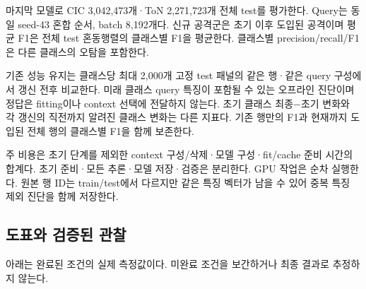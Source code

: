 마지막 모델로 CIC 3,042,473개·ToN 2,271,723개 전체 test를 평가한다. Query는 동일 seed-43 혼합 순서, batch 8,192개다. 신규 공격군은 초기 이후 도입된 공격이며 평균 F1은 전체 test 혼동행렬의 클래스별 F1을 평균한다. 클래스별 precision/\allowbreak{}recall/\allowbreak{}F1은 다른 클래스의 오탐을 포함한다.

기존 성능 유지는 클래스당 최대 2,000개 고정 test 패널의 같은 행·같은 query 구성에서 갱신 전후 비교한다. 미래 클래스 query 특징이 포함될 수 있는 오프라인 진단이며 정답은 fitting이나 context 선택에 전달하지 않는다. 초기 클래스 최종−초기 변화와 각 갱신의 직전까지 알려진 클래스 변화는 다른 지표다. 기존 행만의 F1과 현재까지 도입된 전체 행의 클래스별 F1을 함께 보존한다.

주 비용은 초기 단계를 제외한 context 구성/\allowbreak{}삭제·모델 구성·fit/\allowbreak{}cache 준비 시간의 합계다. 초기 준비·모든 추론·모델 저장·검증은 분리한다. GPU 작업은 순차 실행한다. 원본 행 ID는 train/\allowbreak{}test에서 다르지만 같은 특징 벡터가 남을 수 있어 중복 특징 제외 진단을 함께 저장한다.

\subsection{도표와 검증된 관찰}
아래는 완료된 조건의 실제 측정값이다. 미완료 조건을 보간하거나 최종 결과로 추정하지 않는다.









